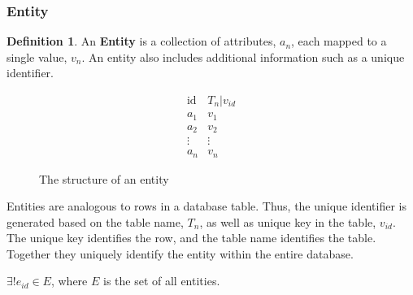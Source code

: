 \documentclass[12pt,letterpaper,oneside]{report}
\theoremstyle{definition}
\newtheorem{defn}{Definition}
\begin{document}
				\subsubsection{Entity}
					\begin{defn}
						An \textbf{Entity} is a collection of attributes, $a_n$, each mapped to a single value, $v_n$.  An entity also includes additional information such as a unique identifier.

						\begin{figure}[!ht]
							\centering
							\[
								\begin{array}{ll}
									\mathrm{id} & T_n|v_{id} \\
									a_1 & v_1 \\
									a_2 & v_2 \\
									\vdots & \vdots \\
									a_n & v_n
								\end{array}
							\]
							\caption{The structure of an entity}
							\label{fig:entity-rep}
						\end{figure}

						Entities are analogous to rows in a database table.  Thus, the unique identifier is generated based on the table name, $T_n$, as well as unique key in the table, $v_{id}$.  The unique key identifies the row, and the table name identifies the table.  Together they uniquely identify the entity within the entire database.

						$\exists! e_{id} \in E$, where $E$ is the set of all entities.
					\end{defn}
\end{document}
